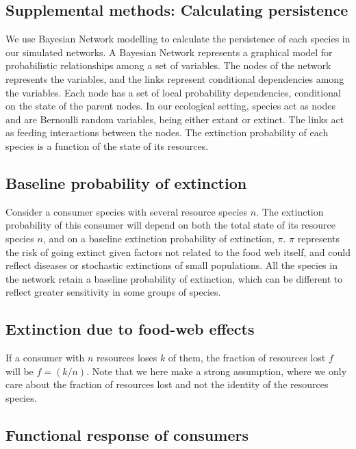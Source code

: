 \documentclass[12pt]{article}
\begin{document}
\begin{spacing}{2.0}
\clearpage

\section{Supplemental methods: Calculating persistence}        

        We use Bayesian Network modelling to calculate the persistence of each species in our simulated networks. 
        A Bayesian Network represents a graphical model for probabilistic relationships among a set of variables. The nodes of the network represents the variables, and the links represent conditional dependencies among the variables. Each node has a set of local probability dependencies, conditional on the state of the parent nodes. 
        In our ecological setting, species act as nodes and are Bernoulli random variables, being either extant or extinct. The links act as feeding interactions between the nodes.
        The extinction probability of each species is a function of the state of its resources.


    \subsection{Baseline probability of extinction}

        Consider a consumer species with several resource species $n$. 
        The extinction probability
        of this consumer will depend on both the total state of its resource species $n$, and on a
        baseline extinction probability of extinction, $\pi$. 
        $\pi$ represents the risk of going extinct
        given factors not related to the food web itself, and could reflect diseases or stochastic
        extinctions of small populations. 
        All the species in the network retain a baseline
        probability of extinction, which can be different to reflect greater sensitivity in some groups of species. 


    \subsection{Extinction due to food-web effects}

        If a consumer with $n$ resources loses $k$ of them, the fraction of resources lost $f$ will be
        $f = (k/n)$. 
        Note that we here make a strong assumption, where we only care about the fraction of resources lost and not the identity of the resources species.


    \subsection{Functional response of consumers}


\end{spacing}
\end{document}
